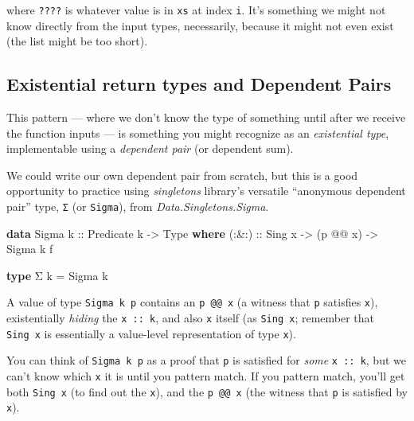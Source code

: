\documentclass[]{article}
\newenvironment{Shaded}{}{}
\newcommand{\DataTypeTok}[1]{\textcolor[rgb]{0.56,0.13,0.00}{#1}}
\newcommand{\KeywordTok}[1]{\textcolor[rgb]{0.00,0.44,0.13}{\textbf{#1}}}
\newcommand{\NormalTok}[1]{#1}
\newcommand{\OperatorTok}[1]{\textcolor[rgb]{0.40,0.40,0.40}{#1}}
\newcommand{\OtherTok}[1]{\textcolor[rgb]{0.00,0.44,0.13}{#1}}
\begin{document}
where \texttt{????} is whatever value is in \texttt{xs} at index \texttt{i}.
It's something we might not know directly from the input types, necessarily,
because it might not even exist (the list might be too short).

\hypertarget{existential-return-types-and-dependent-pairs}{%
\subsection{Existential return types and Dependent
Pairs}\label{existential-return-types-and-dependent-pairs}}

This pattern --- where we don't know the type of something until after we
receive the function inputs --- is something you might recognize as an
\emph{existential type}, implementable using a \emph{dependent pair} (or
dependent sum).

We could write our own dependent pair from scratch, but this is a good
opportunity to practice using \emph{singletons} library's versatile ``anonymous
dependent pair'' type, \texttt{Σ} (or \texttt{Sigma}), from
\emph{Data.Singletons.Sigma}.

\begin{Shaded}
\begin{Highlighting}[]
\KeywordTok{data} \DataTypeTok{Sigma}\OtherTok{ k ::} \DataTypeTok{Predicate}\NormalTok{ k }\OtherTok{{-}>} \DataTypeTok{Type} \KeywordTok{where}
\OtherTok{    (:\&:) ::} \DataTypeTok{Sing}\NormalTok{ x }\OtherTok{{-}>}\NormalTok{ (p }\OperatorTok{@@}\NormalTok{ x) }\OtherTok{{-}>} \DataTypeTok{Sigma}\NormalTok{ k f}

\KeywordTok{type}\NormalTok{ Σ k }\OtherTok{=} \DataTypeTok{Sigma}\NormalTok{ k}
\end{Highlighting}
\end{Shaded}

A value of type \texttt{Sigma\ k\ p} contains an \texttt{p\ @@\ x} (a witness
that \texttt{p} satisfies \texttt{x}), existentially \emph{hiding} the
\texttt{x\ ::\ k}, and also \texttt{x} itself (as \texttt{Sing\ x}; remember
that \texttt{Sing\ x} is essentially a value-level representation of type
\texttt{x}).

You can think of \texttt{Sigma\ k\ p} as a proof that \texttt{p} is satisfied
for \emph{some} \texttt{x\ ::\ k}, but we can't know which \texttt{x} it is
until you pattern match. If you pattern match, you'll get both \texttt{Sing\ x}
(to find out the \texttt{x}), and the \texttt{p\ @@\ x} (the witness that
\texttt{p} is satisfied by \texttt{x}).
\end{document}
